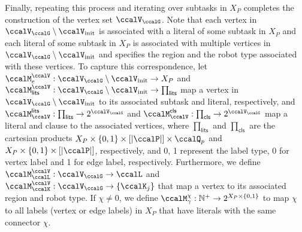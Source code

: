 \documentclass[Afour,sageh,times]{sagej}
\begin{document}
Finally, repeating this process and iterating over subtasks in $X_{P}$ completes the construction of the vertex set $\ccalV_\ccalG$. Note that each vertex in $\ccalV_\ccalG\setminus \ccalV_{\text{init}}$ is associated with a literal of some subtask in $X_P$ and each literal of some subtask in $X_P$ is associated with multiple vertices in $\ccalV_\ccalG\setminus \ccalV_{\text{init}}$ and specifies the region and the robot type associated with these vertices.
To capture this correspondence, let $\ccalM^\ccalV_{e} : \ccalV_{\ccalG}\setminus \ccalV_{\text{init}} \to  X_{P} $ and $\ccalM^\ccalV_{\mathsf{lits}}  : \ccalV_\ccalG\setminus \ccalV_\text{init}  \to  \prod_{\mathsf{lits}} $  map a vertex in $\ccalV_\ccalG \setminus \ccalV_{\text{init}}$ to its associated subtask and literal, respectively, and $\ccalM^\mathsf{lits}_{\ccalV}:   \prod_{\mathsf{lits}}  \to  2^{\ccalV_\ccalG}$ and $\ccalM^\mathsf{cls}_{\ccalV} :  \prod_{\mathsf{cls}} \to  2^{\ccalV_\ccalG}$ map a literal and clause to the associated vertices, where $\prod_{\mathsf{lits}}$ and $\prod_{\mathsf{cls}}$ are the cartesian products $ X_{P} \times\{0, 1\} \times [|\ccalP|]  \times \ccalQ_p$ and $X_{P}\times \{0, 1\} \times[|\ccalP|]$, respectively, and 0, 1 represent the label type, 0 for vertex label and 1 for edge label, respectively. Furthermore, we define $\ccalM^{\ccalV}_\ccalL :  \ccalV_\ccalG  \to  \ccalL$ and $ \ccalM^{\ccalV}_\ccalK :  {\ccalV_\ccalG}  \to  \{\ccalK_j\}$ that map a vertex to its associated  region and robot type. {If $\chi\not=0$, we define  $\ccalM_{\gamma}^\chi: \mathbb{N}^+ \to 2^{X_{P}\times \{0,1\}}$ to map $\chi$ to all labels (vertex or edge labels) in $X_P$ that have literals with the same connector $\chi$}.
\end{document}
